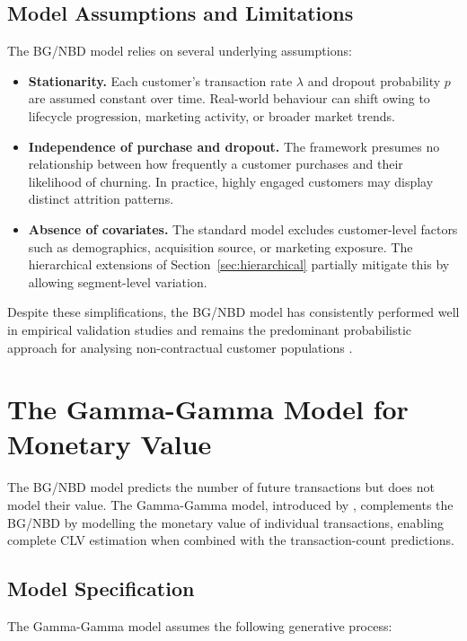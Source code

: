 \documentclass[12pt, a4paper, oneside]{report}
\begin{document}
\subsection{Model Assumptions and Limitations}
\label{sec:bgnbd-assumptions}

The BG/NBD model relies on several underlying assumptions:

\begin{itemize}
  \item \textbf{Stationarity.} Each customer's transaction rate $\lambda$ and dropout probability $p$ are assumed constant over time. Real-world behaviour can shift owing to lifecycle progression, marketing activity, or broader market trends.
  \item \textbf{Independence of purchase and dropout.} The framework presumes no relationship between how frequently a customer purchases and their likelihood of churning. In practice, highly engaged customers may display distinct attrition patterns.
  \item \textbf{Absence of covariates.} The standard model excludes customer-level factors such as demographics, acquisition source, or marketing exposure. The hierarchical extensions of Section~\ref{sec:hierarchical} partially mitigate this by allowing segment-level variation.
\end{itemize}

Despite these simplifications, the BG/NBD model has consistently performed well in empirical validation studies and remains the predominant probabilistic approach for analysing non-contractual customer populations \parencite{fader2009}.

\section{The Gamma-Gamma Model for Monetary Value}
\label{sec:gg}

The BG/NBD model predicts the number of future transactions but does not model their value. The Gamma-Gamma model, introduced by \textcite{fader2013}, complements the BG/NBD by modelling the monetary value of individual transactions, enabling complete CLV estimation when combined with the transaction-count predictions.

\subsection{Model Specification}
\label{sec:gg-spec}

The Gamma-Gamma model assumes the following generative process:
\end{document}
